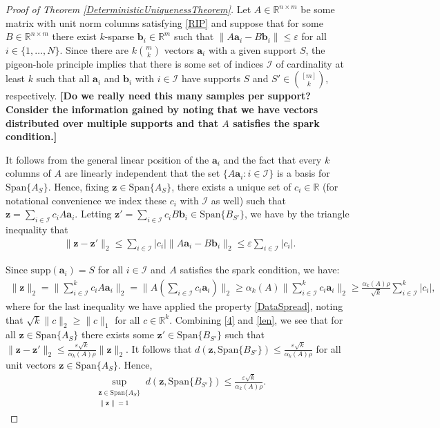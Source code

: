 \documentclass[journal, onecolumn]{IEEEtran}
\begin{document}
\begin{proof}[Proof of Theorem \ref{DeterministicUniquenessTheorem}]
Let $A \in \mathbb{R}^{n \times m}$ be some matrix with unit norm columns satisfying \eqref{RIP} and suppose that for some $B \in \mathbb{R}^{n \times m}$ there exist $k$-sparse $\mathbf{b}_i \in \mathbb{R}^m$ such that $\|A\mathbf{a}_i - B\mathbf{b}_i\| \leq \varepsilon$ for all $i \in \{1, \ldots, N\}$. Since there are $k{m \choose k}$ vectors $\mathbf{a}_i$ with a given support $S$, the pigeon-hole principle implies that there is some set of indices $\mathcal{I}$ of cardinality at least $k$ such that all $\mathbf{a}_i$ and $\mathbf{b}_i$ with $i \in \mathcal{I}$ have supports $S$ and $S' \in {[m] \choose k}$, respectively. \textbf{[Do we really need this many samples per support? Consider the information gained by noting that we have vectors distributed over multiple supports and that $A$ satisfies the spark condition.]}

It follows from the general linear position of the $\mathbf{a}_i$ and the fact that every $k$ columns of $A$ are linearly independent that the set $\{A\mathbf{a}_i: i \in \mathcal{I}\}$ is a basis for $\text{Span}\{A_S\}$. Hence, fixing $\mathbf{z} \in \text{Span}\{A_S\}$, there exists a unique set of $c_i \in \mathbb{R}$ (for notational convenience we index these $c_i$ with $\mathcal{I}$ as well) such that $\mathbf{z} = \sum_{i \in \mathcal{I}} c_iA\mathbf{a}_i$. Letting $\mathbf{z'} = \sum_{i \in \mathcal{I}} c_iB\mathbf{b}_i \in \text{Span}\{B_{S'}\}$, we have by the triangle inequality that
\begin{align}\label{4}
\|\mathbf{z} - \mathbf{z'}\|_2
\leq \sum_{i \in \mathcal{I}} |c_i| \| A\mathbf{a}_i - B\mathbf{b}_i \|_2 \leq \varepsilon \sum_{i \in \mathcal{I}} |c_i|.
\end{align}

Since $\text{supp}(\mathbf{a}_i) = S$ for all $i \in \mathcal{I}$ and $A$ satisfies the spark condition, we have:
\begin{align}\label{len}
\|\mathbf{z}\|_2 = \|\sum_{i \in \mathcal{I}}^k c_i A \mathbf{a}_i\|_2 
= \|A (\sum_{i \in \mathcal{I}} c_i \mathbf{a}_i) \|_2 
\geq \alpha_{k}(A) \|\sum_{i \in \mathcal{I}}^k c_i \mathbf{a}_i\|_2 
\geq \frac{\alpha_{k}(A)\rho}{\sqrt{k}}\sum_{i \in \mathcal{I}}^k |c_i|,
\end{align}
%
where for the last inequality we have applied the property \eqref{DataSpread}, noting that $\sqrt{k}\|c\|_2 \geq \|c\|_1$ for all $c \in \mathbb{R}^k$. Combining \eqref{4} and \eqref{len}, we see that for all $\mathbf{z} \in \text{Span}\{A_S\}$ there exists some $\mathbf{z}' \in \text{Span}\{B_{S'}\}$ such that $\|\mathbf{z} - \mathbf{z}'\|_2 \leq \frac{ \varepsilon \sqrt{k}}{ \alpha_{k}(A) \rho } \|\mathbf{z}\|_2$. It follows that $d(\mathbf{z}, \text{Span}\{B_{S'}\}) \leq \frac{ \varepsilon \sqrt{k} }{ \alpha_{k}(A) \rho }$ for all unit vectors $\mathbf{z} \in \text{Span}\{A_S\}$. Hence,
\begin{align}\label{ABSubspaceDistance}
\sup_{ \substack{ \mathbf{z} \in \text{Span}\{A_{S}\} \\ \|\mathbf{z}\| = 1} } d(\mathbf{z}, \text{Span}\{B_{S'}\}) \leq \frac{ \varepsilon \sqrt{k} }{ \alpha_{k}(A) \rho }.
\end{align}


\end{proof}
\end{document}
